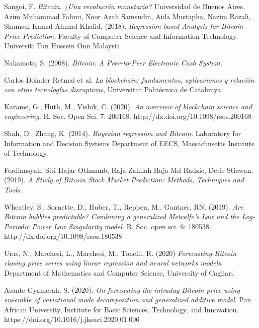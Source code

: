 \documentclass[a4paper,12pt,twocolumn]{article}
\begin{document}
%
\begin{thebibliography}{0000}

Sangoi, F.
{\em Bitcoin. ¿Una revolución monetaria?}
Universidad de Buenos Aires.
%
Azim Muhammad Fahmi, Noor Azah Samsudin, Aida Mustapha, 
Nazim Razali, Shamsul Kamal Ahmad Khalid. (2018).
{\em Regression based Analysis for Bitcoin Price Prediction.}
Faculty of Computer Science and Information Technology, Universiti Tun Hussein Onn Malaysia.

Nakamoto, S. (2008).
{\em Bitcoin: A Peer-to-Peer Electronic Cash System.}

Carlos Dolader Retmal et al.
{\em La blockchain: fundamentos, aplicaciones y relación con otras tecnologías disruptivas}, Universitat Politécnica de Catalunya.

Karame, G., Huth, M., Vishik, C. (2020).
{\em An overview of blockchain science and
engineering.} R. Soc. Open Sci. 7: 200168.
http://dx.doi.org/10.1098/rsos.200168


Shah, D., Zhang, K. (2014).
{\em Bayesian regression and Bitcoin.} 
Laboratory for Information and Decision Systems
Department of EECS, Massachusetts Institute of Technology.


Ferdiansyah, Siti Hajar Othmanb, Raja Zahilah Raja Md Radzic, Deris Stiawan. (2019).
{\em A Study of Bitcoin Stock Market Prediction: Methods, Techniques and Tools.} 

Wheatley, S., Sornette, D., Huber, T., Reppen, M., Gantner, RN. (2019). 
{\em Are Bitcoin bubbles predictable? Combining a generalized
Metcalfe’s Law and the Log-Periodic Power Law
Singularity model.} R. Soc. open sci. 6: 180538.
http://dx.doi.org/10.1098/rsos.180538

Uras, N., Marchesi, L., Marchesi, M., Tonelli, R. (2020)
{\em Forecasting Bitcoin closing price series using linear
regression and neural networks models}. Department of Mathematics and Computer Science,
University of Cagliari.

Asante Gyamerah, S. (2020).
{\em On forecasting the intraday Bitcoin price using ensemble of variational
mode decomposition and generalized additive model}. Pan African University, Institute for Basic Sciences, Technology, and Innovation.
https://doi.org/10.1016/j.jksuci.2020.01.006



\end{thebibliography}
\end{document}
